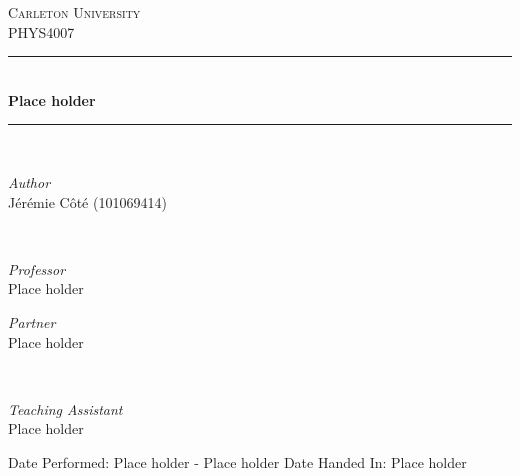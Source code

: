 \documentclass[11pt, letterpaper]{article}
\begin{document}

\begin{titlepage}
	\newcommand{\HRule}{\rule{\linewidth}{0.5mm}}
	\center

	\textsc{\LARGE Carleton University}\\[1.5cm]
	\textsc{\large PHYS4007}\\[0.5cm]

	\HRule\\[0.4cm]

	{\huge\bfseries Place holder}\\[0.4cm]

	\HRule\\[1.5cm]

	\begin{minipage}{0.4\textwidth}
		\begin{flushleft}
			\large
			\textit{Author}\\
			Jérémie Côté %
            \newline
            (101069414)
		\end{flushleft}
	\end{minipage}
	~%
	\begin{minipage}{0.4\textwidth}
		\begin{flushright}
			\large
			\textit{Professor}\\
			Place holder %
		\end{flushright}
	\end{minipage}

	\vfill

	\begin{minipage}{0.4\textwidth}
		\begin{flushleft}
			\large
			\textit{Partner}\\
			Place holder %
		\end{flushleft}
	\end{minipage}
	~%
	\begin{minipage}{0.4\textwidth}
		\begin{flushright}
			\large
			\textit{Teaching Assistant}\\
			Place holder	%
		\end{flushright}
	\end{minipage}

	\vfill\vfill\vfill

	{\large Date Performed: Place holder - Place holder}
	\center
	{\large Date Handed In: Place holder}

\end{titlepage}
\end{document}
